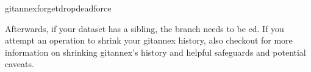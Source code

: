 \begin{sphinxVerbatim}[commandchars=\\\{\}]
gitannexforget\PYGZhy{}\PYGZhy{}drop\PYGZhy{}dead\PYGZhy{}\PYGZhy{}force
\end{sphinxVerbatim}

\sphinxAtStartPar
Afterwards, if your dataset has a sibling, the branch needs to be
{\hyperref[\detokenize{glossary:term-force-push}]{}}ed. If you attempt an operation to shrink your git\sphinxhyphen{}annex
history, also checkout
for more information on shrinking git\sphinxhyphen{}annex’s history and helpful safeguards and
potential caveats.

\appendix

\sphinxstepscope


